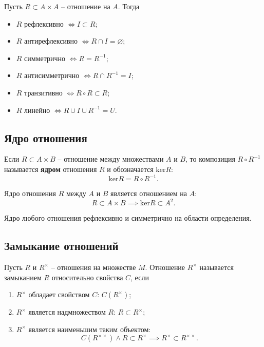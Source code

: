 \begin{theorem*}
    Пусть \(R \subset A \times A\) -- отношение на \(A\). Тогда
    \begin{itemize}
        \item \(R \text{ рефлексивно } \iff I \subset R\);
        \item \(R \text{ антирефлексивно } \iff R \cap I = \varnothing\);
        \item \(R \text{ симметрично } \iff R = R^{-1}\);
        \item \(R \text{ антисимметрично } \iff R \cap R^{-1} = I\);
        \item \(R \text{ транзитивно } \iff R \circ R \subset R\);
        \item \(R \text{ линейно } \iff R \cup I \cup R^{-1} = U\).
    \end{itemize}
\end{theorem*}

\subsection{Ядро отношения}

Если \(R \subset A \times B\) -- отношение между множествами \(A\) и \(B\), то композиция \(R \circ R^{-1}\) называется \textbf{ядром} отношения \(R\) и обозначается \(\text{ker} R\):
\[
    \text{ker} R = R \circ R^{-1}.
\]

Ядро отношения \(R\) между \(A\) и \(B\) является отношением на \(A\):
\[
    R \subset A \times B \implies \text{ker} R \subset A^2.
\]

\begin{theorem*}
    Ядро любого отношения рефлексивно и симметрично на области определения.
\end{theorem*}

\subsection{Замыкание отношений}

Пусть \(R\) и \(R^\times\) -- отношения на множестве \(M\). Отношение \(R^\times\) называется замыканием \(R\) относительно свойства \(C\), если
\begin{enumerate}
    \item \(R^\times\) обладает свойством \(C\): \(C(R^\times)\);
    \item \(R^\times\) является надмножеством \(R\): \(R \subset R^\times\);
    \item \(R^\times\) является наименьшим таким объектом:
          \[
              C(R^{\times \times}) \land R \subset R^\times \implies R^\times \subset R^{\times \times}.
          \]
\end{enumerate}

